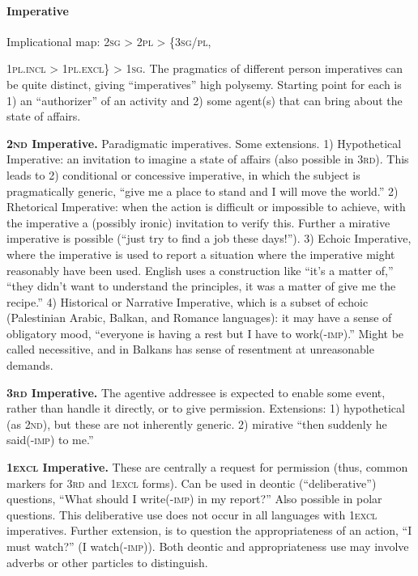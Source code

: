 \documentclass[11pt]{article}
\newcommand{\I}[1]{\textsc{#1}}   %
\begin{document}
\paragraph{Imperative}
Implicational map: \I{2sg} > \I{2pl} > \{\I{3sg/pl}, {\I{1pl.incl} >
\I{1pl.excl}\} > \I{1sg}.  The pragmatics of different person
imperatives can be quite distinct, giving ``imperatives'' high
polysemy.  Starting point for each is 1) an ``authorizer'' of an
activity and 2) some agent(s) that can bring about the state of
affairs.

\textbf{\I{2nd} Imperative.} Paradigmatic imperatives. Some
extensions.  1) Hypothetical Imperative: an invitation to imagine a
state of affairs (also possible in \I{3rd}).  This leads to 2)
conditional or concessive imperative, in which the subject is
pragmatically generic, ``give me a place to stand and I will move the
world.'' 2) Rhetorical Imperative: when the action is difficult or
impossible to achieve, with the imperative a (possibly ironic)
invitation to verify this.  Further a mirative imperative is possible
(``just try to find a job these days!'').  3) Echoic Imperative, where
the imperative is used to report a situation where the imperative
might reasonably have been used.  English uses a construction like
``it's a matter of,'' ``they didn't want to understand the principles,
it was a matter of give me the recipe.''  4) Historical or Narrative
Imperative, which is a subset of echoic (Palestinian Arabic, Balkan,
and Romance languages): it may have a sense of obligatory mood,
``everyone is having a rest but I have to work(-\I{imp}).''  Might be
called necessitive, and in Balkans has sense of resentment at
unreasonable demands.

\textbf{\I{3rd} Imperative.} The agentive addressee is expected to
enable some event, rather than handle it directly, or to give
permission.  Extensions: 1) hypothetical (as \I{2nd}), but these are
not inherently generic.  2) mirative ``then suddenly he said(-\I{imp})
to me.''

\textbf{\I{1excl} Imperative.} These are centrally a request for
permission (thus, common markers for \I{3rd} and \I{1excl} forms).
Can be used in deontic (``deliberative'') questions, ``What should I
write(-\I{imp}) in my report?''  Also possible in polar questions.
This deliberative use does not occur in all languages with \I{1excl}
imperatives.  Further extension, is to question the appropriateness of
an action, ``I must watch?'' (I watch(-\I{imp})).  Both deontic and
appropriateness use may involve adverbs or other particles to
distinguish. 

}
\end{document}
